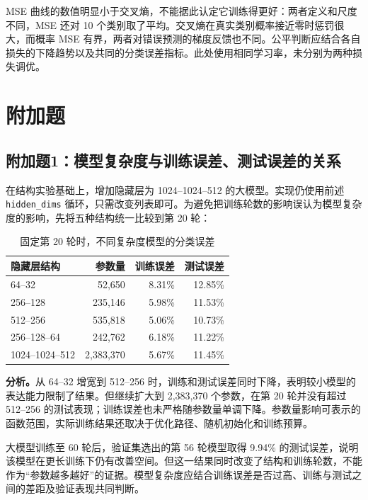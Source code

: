 \documentclass[UTF8,11pt,a4paper,fontset=fandol]{ctexart}
\newcommand{\question}[1]{\Needspace{14\baselineskip}\subsection{#1}}
\begin{document}
MSE 曲线的数值明显小于交叉熵，不能据此认定它训练得更好：两者定义和尺度不同，MSE 还对 10 个类别取了平均。交叉熵在真实类别概率接近零时惩罚很大，而概率 MSE 有界，两者对错误预测的梯度反馈也不同。公平判断应结合各自损失的下降趋势以及共同的分类误差指标。此处使用相同学习率，未分别为两种损失调优。

\clearpage
\section{附加题}
\question{附加题1：模型复杂度与训练误差、测试误差的关系}
在结构实验基础上，增加隐藏层为 1024--1024--512 的大模型。实现仍使用前述 \texttt{hidden\_dims} 循环，只需改变列表即可。为避免把训练轮数的影响误认为模型复杂度的影响，先将五种结构统一比较到第 20 轮：
\begin{table}[H]\centering\small
\caption{固定第 20 轮时，不同复杂度模型的分类误差}
\begin{tabular}{lrrr}\toprule
隐藏层结构 & 参数量 & 训练误差 & 测试误差 \\\midrule
64--32 & 52,650 & 8.31\% & 12.85\% \\
256--128 & 235,146 & 5.98\% & 11.53\% \\
512--256 & 535,818 & 5.06\% & 10.73\% \\
256--128--64 & 242,762 & 6.18\% & 11.22\% \\
1024--1024--512 & 2,383,370 & 5.67\% & 11.45\% \\

\bottomrule\end{tabular}
\end{table}
\textbf{分析。}从 64--32 增宽到 512--256 时，训练和测试误差同时下降，表明较小模型的表达能力限制了结果。但继续扩大到 2,383,370 个参数，在第 20 轮并没有超过 512--256 的测试表现；训练误差也未严格随参数量单调下降。参数量影响可表示的函数范围，实际训练结果还取决于优化路径、随机初始化和训练预算。

大模型训练至 60 轮后，验证集选出的第 56 轮模型取得 9.94\% 的测试误差，说明该模型在更长训练下仍有改善空间。但这一结果同时改变了结构和训练轮数，不能作为“参数越多越好”的证据。模型复杂度应结合训练误差是否过高、训练与测试之间的差距及验证表现共同判断。
\end{document}
